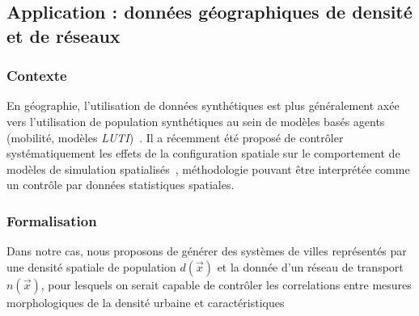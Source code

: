 \subsection{Application : données géographiques de densité et de réseaux}



\subsubsection{Contexte}


En géographie, l'utilisation de données synthétiques est plus généralement axée vers l'utilisation de population synthétiques au sein de modèles basés agents (mobilité, modèles \emph{LUTI})~\cite{pritchard2009advances}. Il a récemment été proposé de contrôler systématiquement les effets de la configuration spatiale sur le comportement de modèles de simulation spatialisés~\cite{cottineau2015revisiting}, méthodologie pouvant être interprétée comme un contrôle par données statistiques spatiales.



\subsubsection{Formalisation}

Dans notre cas, nous proposons de générer des systèmes de villes représentés par une densité spatiale de population $d(\vec{x})$ et la donnée d'un réseau de transport $n(\vec{x})$, pour lesquels on serait capable de contrôler les correlations entre mesures morphologiques de la densité urbaine et caractéristiques 



